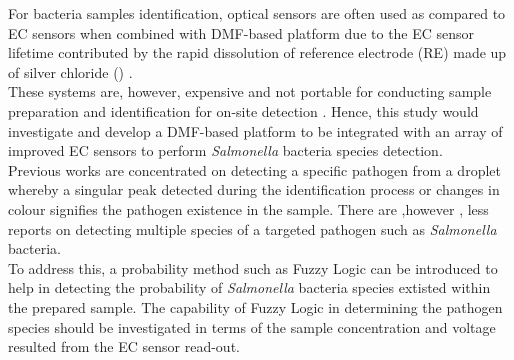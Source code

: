 For bacteria samples identification, optical sensors are often used as compared to EC sensors when combined with DMF-based platform due to the EC sensor lifetime contributed by the rapid dissolution of reference electrode (RE) made up of silver chloride () \cite{farzbodIntegrationReconfigurablePotentiometric2018}.\\

These systems are, however, expensive and not portable for conducting sample preparation and identification for on-site detection \cite{andersonThinfilmtransistorDigitalMicrofluidics2021}. Hence, this study would investigate and develop a DMF-based platform to be integrated with an array of improved EC sensors to perform \emph{Salmonella} bacteria species detection.\\

Previous works are concentrated on detecting a specific pathogen from a droplet \cite{andersonThinfilmtransistorDigitalMicrofluidics2021,foudehRapidMultiplexDetection2015,luSensitiveAutomatedDetection2023 ,sistaDigitalMicrofluidicPlatform2011} whereby a singular peak detected during the identification process or changes in colour signifies the pathogen existence in the sample. There are ,however ,  less reports on detecting multiple species of a targeted pathogen such as \emph{Salmonella} bacteria.\\

To address this, a probability method such as Fuzzy Logic can be introduced to help in detecting the probability of \emph{Salmonella} bacteria species extisted within the prepared sample. The capability of Fuzzy Logic in determining the pathogen species should be investigated in terms of the sample concentration and voltage resulted from the EC sensor read-out.
